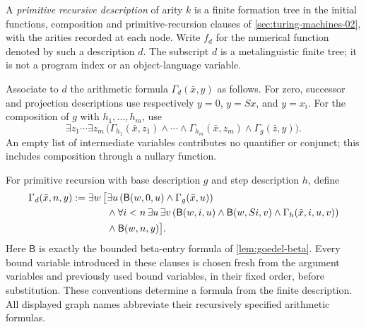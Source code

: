 \begin{definition}
\label{def:p05-pa-pr-graph}
A \emph{primitive recursive description} of arity \(k\) is a finite
formation tree in the initial functions, composition and primitive-recursion
clauses of \cref{sec:turing-machines-02}, with the arities recorded at each
node.  Write \(f_d\) for the numerical function denoted by such a description
\(d\).  The subscript \(d\) is a metalinguistic finite tree; it is not a
program index or an object-language variable.

Associate to \(d\) the arithmetic formula \(\Gamma_d(\bar x,y)\) as follows.
For zero, successor and projection descriptions use respectively
\(y=0\), \(y=Sx\), and \(y=x_i\).  For the composition of \(g\) with
\(h_1,\ldots,h_m\), use
\[
 \exists z_1\cdots\exists z_m\,
 \bigl(\Gamma_{h_1}(\bar x,z_1)\land\cdots\land
       \Gamma_{h_m}(\bar x,z_m)\land\Gamma_g(\bar z,y)\bigr).
\]
An empty list of intermediate variables contributes no quantifier or
conjunct; this includes composition through a nullary function.

For primitive recursion with base description \(g\) and step description
\(h\), define
\[
\begin{split}
 \Gamma_d(\bar x,n,y)\mathrel{:=}\exists w\,\bigl[&
   \exists u\,(\mathsf B(w,0,u)\land\Gamma_g(\bar x,u))\\
 &\land\forall i<n\,\exists u\,\exists v\,
   (\mathsf B(w,i,u)\land\mathsf B(w,Si,v)
                  \land\Gamma_h(\bar x,i,u,v))\\
 &\land\mathsf B(w,n,y)\bigr].
\end{split}
\]
Here \(\mathsf B\) is exactly the bounded beta-entry formula of
\cref{lem:goedel-beta}.  Every bound variable introduced in these clauses is
chosen fresh from the argument variables and previously used bound variables,
in their fixed order, before substitution.  These conventions determine a
formula from the finite description.  All displayed graph names abbreviate
their recursively specified arithmetic formulas.
\end{definition}

